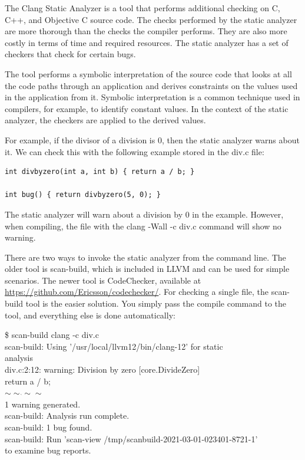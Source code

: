 The Clang Static Analyzer is a tool that performs additional checking on C, C++, and Objective C source code. The checks performed by the static analyzer are more thorough than the checks the compiler performs. They are also more costly in terms of time and required resources. The static analyzer has a set of checkers that check for certain bugs.\par

The tool performs a symbolic interpretation of the source code that looks at all the code paths through an application and derives constraints on the values used in the application from it. Symbolic interpretation is a common technique used in compilers, for example, to identify constant values. In the context of the static analyzer, the checkers are applied to the derived values.\par

For example, if the divisor of a division is 0, then the static analyzer warns about it. We can check this with the following example stored in the div.c file:\par

\begin{lstlisting}[caption={}]
int divbyzero(int a, int b) { return a / b; }

int bug() { return divbyzero(5, 0); }
\end{lstlisting}

The static analyzer will warn about a division by 0 in the example. However, when compiling, the file with the clang -Wall -c div.c command will show no warning.\par

There are two ways to invoke the static analyzer from the command line. The older tool is scan-build, which is included in LLVM and can be used for simple scenarios. The newer tool is CodeChecker, available at \url{https://github.com/Ericsson/codechecker/}. For checking a single file, the scan-build tool is the easier solution. You simply pass the compile command to the tool, and everything else is done automatically:\par

\begin{tcolorbox}[colback=white,colframe=black]
\$ scan-build clang -c div.c \\
scan-build: Using '/usr/local/llvm12/bin/clang-12' for static \\
analysis \\
div.c:2:12: warning: Division by zero [core.DivideZero] \\
\hspace*{0.5cm}return a / b; \\
\hspace*{1.3cm}$\sim\sim\hat{}\sim\sim$ \\
1 warning generated. \\
scan-build: Analysis run complete. \\
scan-build: 1 bug found. \\
scan-build: Run 'scan-view /tmp/scanbuild-2021-03-01-023401-8721-1' \\
to examine bug reports.
\end{tcolorbox}


